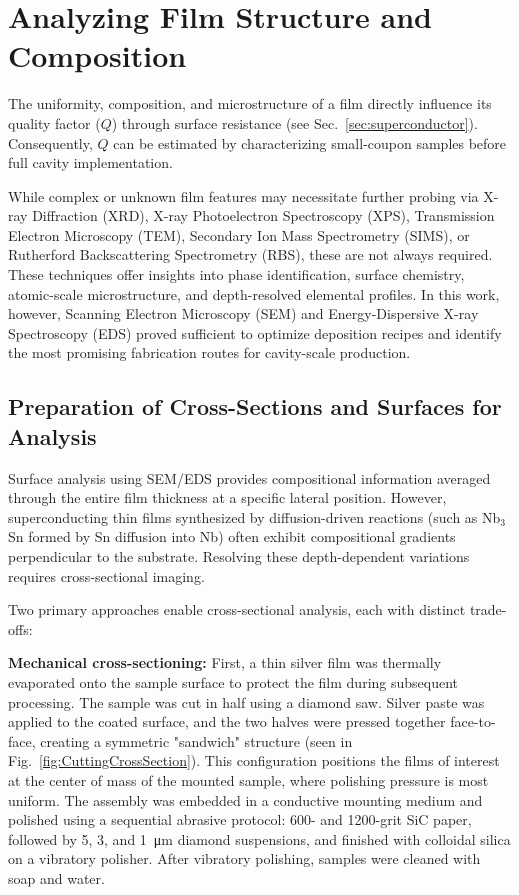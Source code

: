 \section{Analyzing Film Structure and Composition}

The uniformity, composition, and microstructure of a film directly influence its quality factor ($Q$) through surface resistance (see Sec.~\ref{sec:superconductor}). Consequently, $Q$ can be estimated by characterizing small-coupon samples before full cavity implementation. 

While complex or unknown film features may necessitate further probing via X-ray Diffraction (XRD), X-ray Photoelectron Spectroscopy (XPS), Transmission Electron Microscopy (TEM), Secondary Ion Mass Spectrometry (SIMS), or Rutherford Backscattering Spectrometry (RBS), these are not always required. These techniques offer insights into phase identification, surface chemistry, atomic-scale microstructure, and depth-resolved elemental profiles. In this work, however, Scanning Electron Microscopy (SEM) and Energy-Dispersive X-ray Spectroscopy (EDS) proved sufficient to optimize deposition recipes and identify the most promising fabrication routes for cavity-scale production.

\subsection{Preparation of Cross-Sections and Surfaces for Analysis}

    
    Surface analysis using SEM/EDS provides compositional information averaged through the entire film thickness at a specific lateral position. However, superconducting thin films synthesized by diffusion-driven reactions (such as Nb$_3$Sn formed by Sn diffusion into Nb) often exhibit compositional gradients perpendicular to the substrate. Resolving these depth-dependent variations requires cross-sectional imaging.
    
    Two primary approaches enable cross-sectional analysis, each with distinct trade-offs:
    
    \noindent \textbf{Mechanical cross-sectioning:} First, a thin silver film was thermally evaporated onto the sample surface to protect the film during subsequent processing. The sample was cut in half using a diamond saw. Silver paste was applied to the coated surface, and the two halves were pressed together face-to-face, creating a symmetric "sandwich" structure (seen in Fig.~\ref{fig:CuttingCrossSection}). This configuration positions the films of interest at the center of mass of the mounted sample, where polishing pressure is most uniform. The assembly was embedded in a conductive mounting medium and polished using a sequential abrasive protocol: 600- and 1200-grit SiC paper, followed by 5, 3, and 1~\unit{\um} diamond suspensions, and finished with colloidal silica on a vibratory polisher. After vibratory polishing, samples were cleaned with soap and water.

